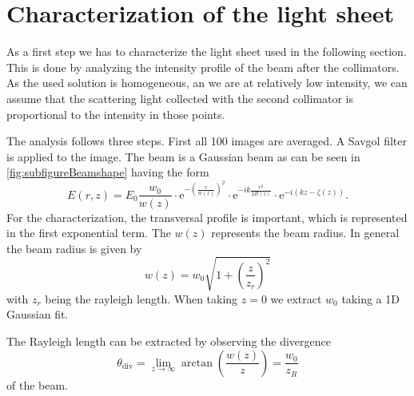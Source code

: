 \section{Characterization of the light sheet}
\label{sec:LightSheet}

As a first step we has to characterize the light sheet used in the following section. This is done by analyzing the intensity profile 
of the beam after the collimators. As the used solution is homogeneous, an we are at relatively low intensity, we can 
assume that the scattering light collected with the second collimator is proportional to the intensity in those points.

The analysis follows three steps. First all 100 images are averaged. A Savgol filter is applied to the image.
The beam is a Gaussian beam as can be seen in \cref{fig:subfigureBeamshape} having the form
\begin{equation}
    E(r, z)=E_0 \frac{w_0}{w(z)} \cdot \mathrm{e}^{-\left(\frac{r}{w(z)}\right)^2} \cdot \mathrm{e}^{-i k \frac{r^2}{2 R(z)}} \cdot \mathrm{e}^{-i(k z-\zeta(z))}.
\end{equation}
For the characterization, the transversal profile is important, which is represented in the first exponential term. The $w(z)$ represents the beam radius. 
In general the beam radius is given by 
\begin{equation}
    w(z) = w_0 \sqrt{1+\left(\frac{z}{z_r}\right)^2}
\end{equation} 
with $z_r$ being the rayleigh length. When taking $z=0$ we extract $w_0$ taking a 1D Gaussian fit.

The Rayleigh length can be extracted by observing the divergence 
\begin{equation}
    \theta_{\mathrm{div}} = \lim_{z \to \infty} \arctan\left(\frac{w(z)}{z}\right) = \frac{w_0}{z_R}
\end{equation}
of the beam. 

